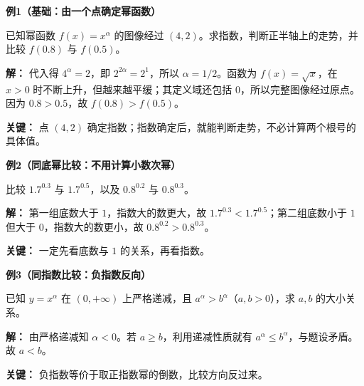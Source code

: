\clearpage
\begin{examplebox}
  \textbf{\textcolor{CExample}{例1（基础：由一个点确定幂函数）}}



  已知幂函数 $f(x)=x^\alpha$ 的图像经过 $(4,2)$。求指数，判断正半轴上的走势，并比较 $f(0.8)$ 与 $f(0.5)$。

  \textbf{解：} 代入得 $4^\alpha=2$，即 $2^{2\alpha}=2^1$，所以 $\alpha=1/2$。函数为 $f(x)=\sqrt{x}$，在 $x>0$ 时不断上升，但越来越平缓；其定义域还包括 $0$，所以完整图像经过原点。因为 $0.8>0.5$，故 $f(0.8)>f(0.5)$。

  \textbf{关键：} 点 $(4,2)$ 确定指数；指数确定后，就能判断走势，不必计算两个根号的具体值。

  \medskip
  
\end{examplebox}
\clearpage
\begin{examplebox}
\textbf{\textcolor{CExample}{例2（同底幂比较：不用计算小数次幂）}}



  比较 $1.7^{0.3}$ 与 $1.7^{0.5}$，以及 $0.8^{0.2}$ 与 $0.8^{0.3}$。

  \textbf{解：} 第一组底数大于 $1$，指数大的数更大，故 $1.7^{0.3}<1.7^{0.5}$；第二组底数小于 $1$ 但大于 $0$，指数大的数更小，故 $0.8^{0.2}>0.8^{0.3}$。

  \textbf{关键：} 一定先看底数与 $1$ 的关系，再看指数。

  \medskip
  
\end{examplebox}
\clearpage
\begin{examplebox}
\textbf{\textcolor{CExample}{例3（同指数比较：负指数反向）}}



  已知 $y=x^\alpha$ 在 $(0,+\infty)$ 上严格递减，且 $a^\alpha>b^\alpha$（$a,b>0$），求 $a,b$ 的大小关系。

  \textbf{解：} 由严格递减知 $\alpha<0$。若 $a\ge b$，利用递减性质就有 $a^\alpha\le b^\alpha$，与题设矛盾。故 $a<b$。

  \textbf{关键：} 负指数等价于取正指数幂的倒数，比较方向反过来。

  \medskip
  
\end{examplebox}
\clearpage
